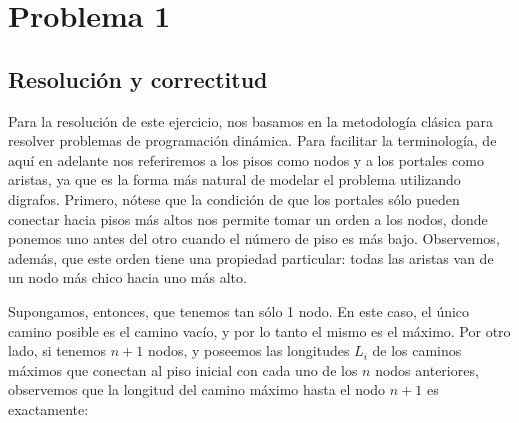 \documentclass{article}
\theoremstyle{definition}
\theoremstyle{remark}
\begin{document}
{} %

\subtitulo{}
\grupo{}

 
\maketitle

\pagebreak

\tableofcontents

\pagebreak


\section{Problema 1}

\subsection{Resolución y correctitud}

Para la resolución de este ejercicio, nos basamos en la metodología clásica para resolver problemas de programación dinámica. Para facilitar la terminología, de aquí en adelante nos referiremos a los pisos como nodos y a los portales como aristas, ya que es la forma más natural de modelar el problema utilizando digrafos. Primero, nótese que la condición de que los portales sólo pueden conectar hacia pisos más altos nos permite tomar un orden a los nodos, donde ponemos uno antes del otro cuando el número de piso es más bajo. Observemos, además, que este orden tiene una propiedad particular: todas las aristas van de un nodo más chico hacia uno más alto.

Supongamos, entonces, que tenemos tan sólo 1 nodo. En este caso, el único camino posible es el camino vacío, y por lo tanto el mismo es el máximo. Por otro lado, si tenemos $n + 1$ nodos, y poseemos las longitudes $L_i$ de los caminos máximos que conectan al piso inicial con cada uno de los $n$ nodos anteriores, observemos que la longitud del camino máximo hasta el nodo $n + 1$ es exactamente:
\end{document}
